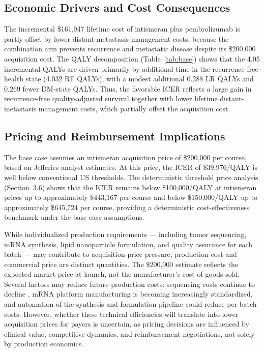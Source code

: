 \documentclass[12pt,a4paper]{article}
\begin{document}
\subsection{Economic Drivers and Cost Consequences}

The incremental \$161,947 lifetime cost of intismeran plus \mbox{pembrolizumab} is partly offset by lower distant-metastasis management costs, because the combination arm prevents recurrence and metastatic disease despite its \$200,000 acquisition cost. The QALY decomposition (Table~\ref{tab:base}) shows that the 4.05 incremental QALYs are driven primarily by additional time in the recurrence-free health state (4.032 RF QALYs), with a modest additional 0.288 LR QALYs and 0.269 fewer DM-state QALYs. Thus, the favorable ICER reflects a large gain in recurrence-free quality-adjusted survival together with lower lifetime distant-metastasis management costs, which partially offset the acquisition cost.

\subsection{Pricing and Reimbursement Implications}

The base case assumes an intismeran acquisition price of \$200,000 per course, based on Jefferies analyst estimates. At this price, the ICER of \$39,976/QALY is well below conventional US thresholds. The deterministic threshold price analysis (Section~3.6) shows that the ICER remains below \$100,000/QALY at intismeran prices up to approximately \$443,167 per course and below \$150,000/QALY up to approximately \$645,724 per course, providing a deterministic cost-effectiveness benchmark under the base-case assumptions.

While individualized production requirements --- including tumor sequencing, mRNA synthesis, lipid nanoparticle formulation, and quality assurance for each batch --- may contribute to acquisition-price pressure, production cost and commercial price are distinct quantities. The \$200,000 estimate reflects the expected market price at launch, not the manufacturer's cost of goods sold. Several factors may reduce future production costs: sequencing costs continue to decline \cite{schwarze2020}, mRNA platform manufacturing is becoming increasingly standardized, and automation of the synthesis and formulation pipeline could reduce per-batch costs. However, whether these technical efficiencies will translate into lower acquisition prices for payers is uncertain, as pricing decisions are influenced by clinical value, competitive dynamics, and reimbursement negotiations, not solely by production economics.
\end{document}
